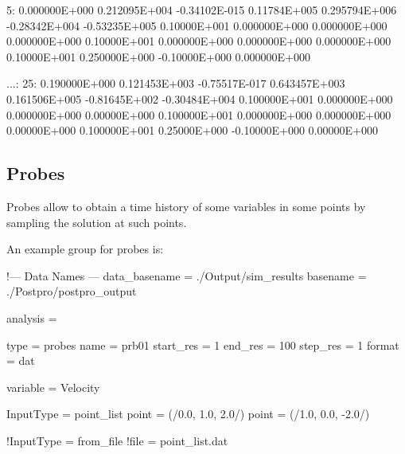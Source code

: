 \begin{inputfile}
  5: 0.000000E+000    0.212095E+004    -0.34102E-015  0.11784E+005  
     0.295794E+006    -0.28342E+004    -0.53235E+005  0.10000E+001  
     0.000000E+000    0.000000E+000    0.000000E+000  0.10000E+001  
     0.000000E+000    0.000000E+000    0.000000E+000  0.10000E+001  
     0.250000E+000    -0.10000E+000    0.000000E+000
  
...:
  25: 0.190000E+000  0.121453E+003 -0.75517E-017  0.643457E+003  
      0.161506E+005  -0.81645E+002 -0.30484E+004  0.100000E+001  
      0.000000E+000  0.000000E+000  0.00000E+000  0.100000E+001  
      0.000000E+000  0.000000E+000  0.00000E+000  0.100000E+001  
      0.25000E+000   -0.10000E+000  0.00000E+000
\end{inputfile}



\subsection{Probes}

Probes allow to obtain a time history of some variables in some points by sampling the solution at such points. 

An example  group for probes is:

\begin{inputfile}[frame=single, caption={dust\_post.in for probes}, label={file:dust_post.in_probes}]
!--- Data Names ---
data_basename = ./Output/sim_results
basename =     ./Postpro/postpro_output

analysis = {

type = probes
name = prb01
start_res = 1
end_res   = 100 
step_res  = 1
format = dat

variable = Velocity

InputType = point_list
point = (/0.0, 1.0, 2.0/)
point = (/1.0, 0.0, -2.0/)

!InputType = from_file
!file = point_list.dat

}
\end{inputfile}

